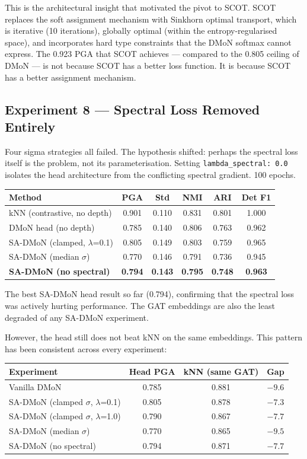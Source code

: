 This is the architectural insight that motivated the pivot to SCOT. SCOT replaces the soft assignment mechanism with Sinkhorn optimal transport, which is iterative (10 iterations), globally optimal (within the entropy-regularised space), and incorporates hard type constraints that the DMoN softmax cannot express. The 0.923 PGA that SCOT achieves --- compared to the 0.805 ceiling of DMoN --- is not because SCOT has a better loss function. It is because SCOT has a better assignment mechanism.


\subsection{Experiment 8 --- Spectral Loss Removed Entirely}

Four sigma strategies all failed. The hypothesis shifted: perhaps the spectral loss itself is the problem, not its parameterisation. Setting \texttt{lambda\_spectral: 0.0} isolates the head architecture from the conflicting spectral gradient. 100 epochs.

\begin{center}
\begin{tabular}{lccccc}
\toprule
Method & PGA & Std & NMI & ARI & Det F1 \\
\midrule
kNN (contrastive, no depth) & 0.901 & 0.110 & 0.831 & 0.801 & 1.000 \\
DMoN head (no depth) & 0.785 & 0.140 & 0.806 & 0.763 & 0.962 \\
SA-DMoN (clamped, $\lambda$=0.1) & 0.805 & 0.149 & 0.803 & 0.759 & 0.965 \\
SA-DMoN (median $\sigma$) & 0.770 & 0.146 & 0.791 & 0.736 & 0.945 \\
\textbf{SA-DMoN (no spectral)} & \textbf{0.794} & \textbf{0.143} & \textbf{0.795} & \textbf{0.748} & \textbf{0.963} \\
\bottomrule
\end{tabular}
\end{center}

The best SA-DMoN head result so far (0.794), confirming that the spectral loss was actively hurting performance. The GAT embeddings are also the least degraded of any SA-DMoN experiment.

However, the head still does not beat kNN on the same embeddings. This pattern has been consistent across every experiment:

\begin{center}
\begin{tabular}{lccc}
\toprule
Experiment & Head PGA & kNN (same GAT) & Gap \\
\midrule
Vanilla DMoN & 0.785 & 0.881 & $-9.6$ \\
SA-DMoN (clamped $\sigma$, $\lambda$=0.1) & 0.805 & 0.878 & $-7.3$ \\
SA-DMoN (clamped $\sigma$, $\lambda$=1.0) & 0.790 & 0.867 & $-7.7$ \\
SA-DMoN (median $\sigma$) & 0.770 & 0.865 & $-9.5$ \\
SA-DMoN (no spectral) & 0.794 & 0.871 & $-7.7$ \\
\bottomrule
\end{tabular}
\end{center}

